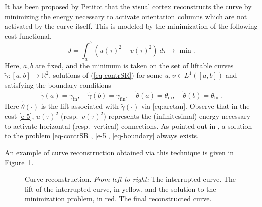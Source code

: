 \documentclass[proc]{edpsmath}
\begin{document}
It has been proposed by Petitot  \cite{pinwheel}
that the visual cortex reconstructs the curve by minimizing the energy necessary to activate orientation columns which are not activated by the curve itself. This is modeled by the minimization of the following cost functional,
\begin{equation}\label{e-5}
  J=\int_a^b \left(u(\tau)^2+ v(\tau)^2\right)~d\tau\to\min.
\end{equation}
Here, $a,b$ are fixed, and the minimum is taken on the set of liftable curves $\tilde \gamma:[a,b]\to\mathbb R^2$,
solutions of (\ref{eq-contrSR}) for some $u,v\in L^1([a,b])$ and satisfying the boundary conditions
\begin{equation}\label{eq-boundary}
\tilde\gamma(a) = \gamma_{\text{in}}, \quad \tilde\gamma(b)=\gamma_{\text{fin}}, \quad \tilde\theta(a) = \theta_{\text{in}}, \quad \tilde\theta(b) = \theta_{\text{fin}}.
\end{equation}
Here $\tilde\theta(\cdot)$ is the lift associated with $\tilde\gamma(\cdot)$ via \eqref{eq:arctan}.
Observe that in the cost \eqref{e-5}, $u(\tau)^2$ (resp.\ $v(\tau)^2$) represents the (infinitesimal) energy necessary to activate horizontal (resp.\ vertical) connections.
As pointed out in \cite{Boscain2012a}, a solution to the problem  \eqref{eq-contrSR}, \eqref{e-5}, \eqref{eq-boundary} always exists.

An example of curve reconstruction obtained via this technique is given in Figure~\ref{fig:image-rec}.

\begin{figure}
\centering
  \caption{Curve reconstruction. \emph{From left to right:} The interrupted curve. The lift of the interrupted curve, in yellow, and the solution to the minimization problem, in red. The final reconstructed curve.}
  \label{fig:image-rec}
\end{figure}
\end{document}
